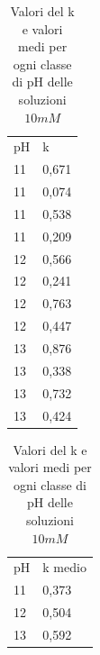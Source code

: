 \begin{table}
\caption{Valori del k e valori medi per ogni classe di pH delle soluzioni $10mM$}
\begin{center}
\begin{tabular}{ll}
pH & k       \\
11 & 0,671   \\
11 & 0,074   \\
11 & 0,538   \\
11 & 0,209   \\
12 & 0,566   \\
12 & 0,241   \\
12 & 0,763   \\
12 & 0,447   \\
13 & 0,876   \\
13 & 0,338   \\
13 & 0,732   \\
13 & 0,424   
\end{tabular}
\begin{tabular}{ll}
pH & k medio \\
11 & 0,373   \\
12 & 0,504 \\
13 & 0,592
\end{tabular}
\end{center}
\end{table}
\pagebreak

